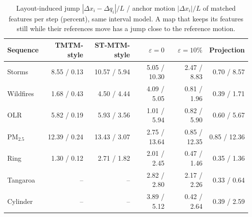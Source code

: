 \begin{table}[H]
\centering\small\setlength{\tabcolsep}{3.2pt}
\caption{Layout-induced jump $|\Delta x_i-\Delta q_i|/L$ / anchor motion $|\Delta x_i|/L$ of matched features per step (percent), same interval model. A map that keeps its features still while their references move has a jump close to the reference motion.}\label{tab:supp_jumps}
\begin{tabular}{lrrrrr}\toprule
Sequence & TMTM-style & ST-MTM-style & $\varepsilon{=}0$ & $\varepsilon{=}10\%$ & Projection\\\midrule
Storms & 8.55 / 0.13 & 10.57 / 5.94 & 5.05 / 10.30 & 2.47 / 8.83 & 0.70 / 8.57\\
Wildfires & 1.68 / 0.43 & 4.50 / 4.44 & 4.09 / 5.05 & 0.81 / 1.96 & 0.39 / 1.71\\
OLR & 5.82 / 0.19 & 5.93 / 3.56 & 1.01 / 5.94 & 0.82 / 5.90 & 0.60 / 5.67\\
PM$_{2.5}$ & 12.39 / 0.24 & 13.43 / 3.07 & 2.75 / 13.64 & 0.85 / 12.35 & 0.85 / 12.36\\
Ring & 1.30 / 0.12 & 2.71 / 1.82 & 2.01 / 2.45 & 0.47 / 1.46 & 0.35 / 1.36\\
Tangaroa & -- & -- & 2.82 / 2.80 & 2.17 / 2.26 & 0.33 / 0.64\\
Cylinder & -- & -- & 3.89 / 5.12 & 0.42 / 2.64 & 0.39 / 2.59\\
\bottomrule\end{tabular}
\end{table}
